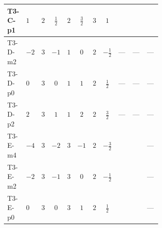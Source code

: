 \documentclass[8pt]{article}
\begin{document}
\begin{landscape}
\begin{longtable}{@{}llcccccc >{\raggedright\arraybackslash}p{0.21\linewidth} >{\raggedright\arraybackslash}p{0.21\linewidth} >{\raggedright\arraybackslash}p{0.21\linewidth}@{}}
\midrule
T3-C-p1 & $1$ & $2$ & $\frac{1}{2}$ & $2$ & $\frac{3}{2}$ & $3$ & $1$ & \scriptsize\adjustbox{max width=\linewidth}{$\begin{gathered} +2 {\lambda_{12}^{(A)}} {\lambda_{S_1}^{(1)}}\end{gathered}$} & \scriptsize\adjustbox{max width=\linewidth}{$\begin{gathered} +2 {\lambda_{12}^{(A)}} {\lambda_{S_2}^{(1)}}\end{gathered}$} & \scriptsize\adjustbox{max width=\linewidth}{$\begin{gathered} +{\lambda_{HS_1}^{(A)}} {\lambda_{HS_2}^{(A)}}\end{gathered}$} \\
\midrule
T3-D-m2 & $-2$ & $3$ & $-1$ & $1$ & $0$ & $2$ & $-\frac{1}{2}$ & --- & --- & --- \\
\midrule
T3-D-p0 & $0$ & $3$ & $0$ & $1$ & $1$ & $2$ & $\frac{1}{2}$ & --- & --- & --- \\
\midrule
T3-D-p2 & $2$ & $3$ & $1$ & $1$ & $2$ & $2$ & $\frac{3}{2}$ & --- & --- & --- \\
\midrule
T3-E-m4 & $-4$ & $3$ & $-2$ & $3$ & $-1$ & $2$ & $-\frac{3}{2}$ & \scriptsize\adjustbox{max width=\linewidth}{$\begin{gathered} +2 {\lambda_{12}^{(A)}} {\lambda_{S_1}^{(1)}}\end{gathered}$} & \scriptsize\adjustbox{max width=\linewidth}{$\begin{gathered} +2 {\lambda_{12}^{(A)}} {\lambda_{S_2}^{(1)}}\end{gathered}$} & --- \\
\midrule
T3-E-m2 & $-2$ & $3$ & $-1$ & $3$ & $0$ & $2$ & $-\frac{1}{2}$ & \scriptsize\adjustbox{max width=\linewidth}{$\begin{gathered} +2 {\lambda_{12}^{(A)}} {\lambda_{S_1}^{(1)}}\end{gathered}$} & \scriptsize\adjustbox{max width=\linewidth}{$\begin{gathered} +2 {\lambda_{12}^{(A)}} {\lambda_{S_2}^{(1)}}\end{gathered}$} & --- \\
\midrule
T3-E-p0 & $0$ & $3$ & $0$ & $3$ & $1$ & $2$ & $\frac{1}{2}$ & \scriptsize\adjustbox{max width=\linewidth}{$\begin{gathered} +2 {\lambda_{12}^{(A)}} {\lambda_{S_1}^{(1)}}\end{gathered}$} & \scriptsize\adjustbox{max width=\linewidth}{$\begin{gathered} +2 {\lambda_{12}^{(A)}} {\lambda_{S_2}^{(1)}}\end{gathered}$} & --- \\

\end{longtable}
\end{landscape}
\end{document}
